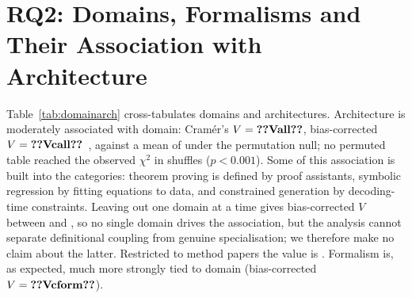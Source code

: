 \section{RQ2: Domains, Formalisms and Their Association with Architecture}
\label{sec:domains}

\begin{table}[t]
\centering
\caption{Task domain $\times$ integration architecture, with check strength (ex.\ = exact, emp.\ = empirical). Shading is proportional to the count.}
\label{tab:domainarch}
\footnotesize

\end{table}

Table~\ref{tab:domainarch} cross-tabulates domains and architectures. Architecture is moderately associated with domain: Cram\'er's $V=\cnt{Vall}$, bias-corrected $V=\cnt{Vcall}$~\cite{bergsma2013bias}, against a mean of  under the permutation null; no permuted table reached the observed $\chi^2$ in  shuffles ($p<0.001$). Some of this association is built into the categories: theorem proving is defined by proof assistants, symbolic regression by fitting equations to data, and constrained generation by decoding-time constraints. Leaving out one domain at a time gives bias-corrected $V$ between  and , so no single domain drives the association, but the analysis cannot separate definitional coupling from genuine specialisation; we therefore make no claim about the latter. Restricted to method papers the value is . Formalism is, as expected, much more strongly tied to domain (bias-corrected $V=\cnt{Vcform}$).

\begin{table}[t]
\centering
\caption{Symbolic formalisms.}
\label{tab:formalism}
\footnotesize

\end{table}

